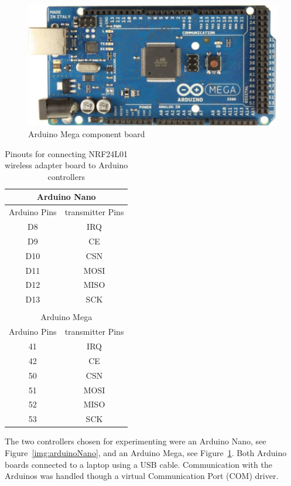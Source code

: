 \begin{figure}[h]
\centering
  \includegraphics[scale=.6]{images/arduinoMega}
    \caption{Arduino Mega component board~\cite{ArduinoMegaPhoto}}
	\label{img:arduinoMega}
\end{figure}

 \begin{table}[b!]
\centering
	\begin{tabular}{|c|c|}
	\hline
\multicolumn{2}{|c|}{Arduino Nano} \\ \hline
Arduino Pins & transmitter Pins \\ \hline
D8 & IRQ \\ \hline
D9 & CE \\ \hline
D10 & CSN \\ \hline
D11 & MOSI \\ \hline
D12 & MISO \\ \hline
D13 & SCK \\ \hline
\multicolumn{2}{c}{} \\ \hline
\multicolumn{2}{|c|}{Arduino Mega} \\ \hline
Arduino Pins & transmitter Pins \\ \hline
41 & IRQ \\ \hline
42 & CE \\ \hline
50 & CSN \\ \hline
51 & MOSI \\ \hline
52 & MISO \\ \hline
53 & SCK \\ \hline
\end{tabular}
        \caption{Pinouts for connecting NRF24L01 wireless adapter board to Arduino controllers}
	\label{table:pinouts}
\end{table}

The two controllers chosen for experimenting were an Arduino Nano, see Figure~\ref{img:arduinoNano}, and an Arduino Mega, see Figure~\ref{img:arduinoMega}.  Both Arduino boards connected to a laptop using a USB cable.  Communication with the Arduinos was handled though a virtual Communication Port (COM) driver. 

